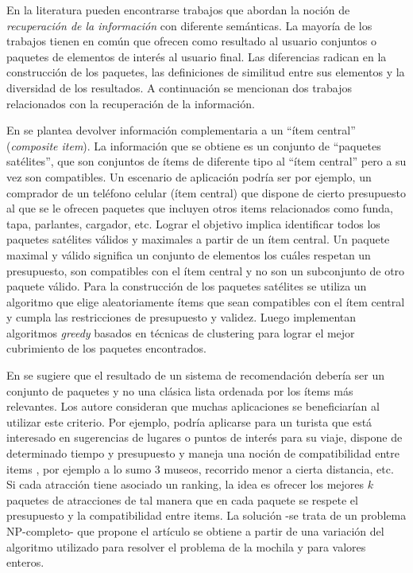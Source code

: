 En la literatura pueden encontrarse trabajos que abordan la noción de \emph{recuperación de la información} con diferente semánticas. La mayoría de los trabajos tienen en común que ofrecen como resultado al usuario conjuntos o paquetes de elementos de interés al usuario final. Las diferencias radican en la construcción de los paquetes, las definiciones de similitud entre sus elementos y la diversidad de los resultados. A continuación se mencionan dos trabajos relacionados con la recuperación de la información.

En \cite{BasuRoy:2010:CEC:1807167.1807258} se plantea devolver información complementaria a un ``ítem central'' (\textit{composite item}). La información que se obtiene es un conjunto de ``paquetes satélites'', que son conjuntos de ítems de diferente tipo al ``ítem central'' pero a su vez son compatibles. Un escenario de aplicación podría ser por ejemplo, un comprador de un teléfono celular (ítem central) que dispone de cierto presupuesto al que se le ofrecen paquetes que incluyen otros items relacionados como funda, tapa, parlantes, cargador, etc. Lograr el objetivo implica identificar todos los paquetes satélites válidos y maximales a partir de un ítem central. Un paquete maximal y válido significa un conjunto de elementos los cuáles respetan un presupuesto, son compatibles con el ítem central y no son un subconjunto de otro paquete válido. Para la construcción de los paquetes satélites se utiliza un algoritmo que elige aleatoriamente ítems que sean compatibles con el ítem central y cumpla las restricciones de presupuesto y validez. Luego implementan algoritmos \emph{greedy} basados en técnicas de clustering para lograr el mejor cubrimiento de los paquetes encontrados.

En \cite{Xie:2010:BOB:1864708.1864739} se sugiere que el resultado de un sistema de recomendación debería ser un conjunto de paquetes y no una clásica lista ordenada por los ítems más relevantes. Los autore consideran que muchas aplicaciones se beneficiarían al utilizar este criterio. Por ejemplo, podría aplicarse para un turista que está interesado en sugerencias de lugares o puntos de interés para su viaje, dispone de determinado tiempo y presupuesto y maneja una noción de compatibilidad entre items , por ejemplo a lo sumo 3 museos, recorrido menor a cierta distancia, etc. Si cada atracción tiene asociado un ranking, la idea es ofrecer los mejores $k$ paquetes de atracciones de tal manera que en cada paquete se respete el presupuesto y la compatibilidad entre items. La solución -se trata de un problema NP-completo- que propone el artículo se obtiene a partir de una variación del  algoritmo utilizado para resolver el problema de la mochila \cite{RKarp} y \cite{EGossett} para valores enteros. 

